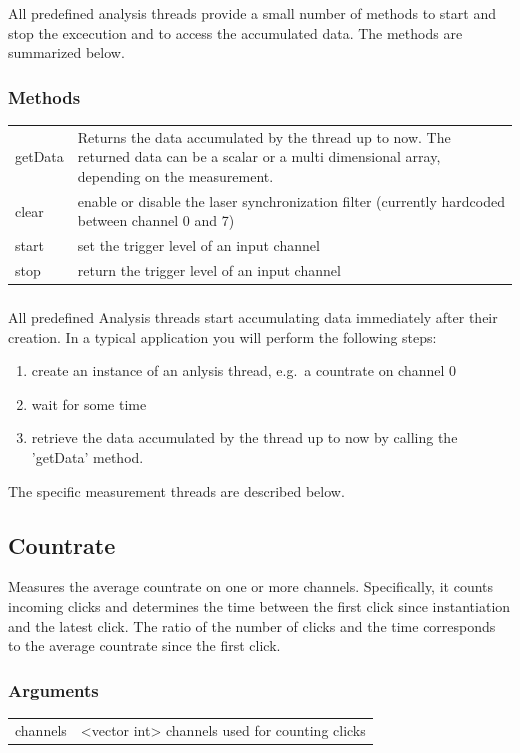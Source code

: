 \documentclass[oneside]{memoir}
\begin{document}
All predefined analysis threads provide a small number of methods to start and stop the excecution
and to access the accumulated data. The methods are summarized below.
\subsubsection{Methods}
\begin{tabular}{p{}p{}}
  getData & Returns the data accumulated by the thread up to now. The returned data can be a scalar or a multi
dimensional array, depending on the measurement.\\
  clear & enable or disable the laser synchronization filter (currently hardcoded between channel 0 and 7)\\
  start & set the trigger level of an input channel\\
  stop & return the trigger level of an input channel\\
\end{tabular}
\subsubsection*{}
All predefined Analysis threads start accumulating data immediately after their creation.
In a typical application you will perform the following steps:
\begin{enumerate}
 \item create an instance of an anlysis thread, e.g.~a countrate on channel 0
 \item wait for some time
 \item retrieve the data accumulated by the thread up to now by calling the 'getData' method.
\end{enumerate}
The specific measurement threads are described below.

\subsection{Countrate}

Measures the average countrate on one or more channels. Specifically, it
counts incoming clicks and determines the time between the first click since
instantiation and the latest click. The ratio of the number of clicks and the
time corresponds to the average countrate since the first click.
\subsubsection{Arguments}
\begin{tabular}{p{}p{}}
  channels & <vector int> channels used for counting clicks\\
\end{tabular}
\end{document}
